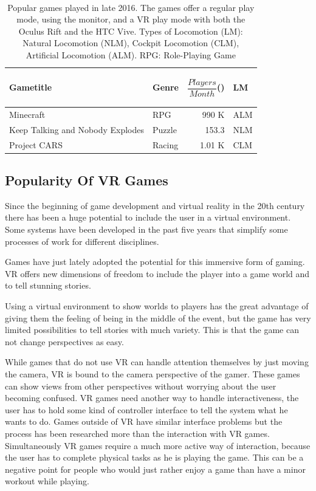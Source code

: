 \begin{table}
	\caption{Popular games played in late 2016. The games offer a regular play mode, using the monitor, and a VR play mode with both the Oculus Rift and the HTC Vive. Types of Locomotion (LM): Natural Locomotion (NLM), Cockpit Locomotion (CLM), Artificial Locomotion (ALM). RPG: Role-Playing Game}~\label{tab:popularGames}
	
	\renewcommand{\arraystretch}{1.3}%
	\begin{tabular*}{\columnwidth}{ p{33mm} l r l }
		Gametitle & Genre & \parbox[c][2.2em][t]{2cm}{\begin{flushright}$\dfrac{Players}{Month}$(\footnotemark[2])\end{flushright}} & LM \\
		\hline
		Minecraft & RPG & 990 K & ALM \\
		Keep Talking and \newline Nobody Explodes & Puzzle & 153.3 & NLM \\
		Project CARS & Racing & 1.01 K & CLM\\
	\end{tabular*}
	
\end{table}


\subsection{Popularity Of VR Games}
Since the beginning of game development and virtual reality in the 20th century there has been a huge potential to include the user in a virtual environment. Some systems have been developed in the past five years that simplify some processes of work for different disciplines. 

Games have just lately adopted the potential for this immersive form of gaming. VR offers new dimensions of freedom to include the player into a game world and to tell stunning stories.

Using a virtual environment to show worlds to players has the great advantage of giving them the feeling of being in the middle of the event, but the game has very limited possibilities to tell stories with much variety. This is that the game can not change perspectives as easy. 

While games that do not use VR can handle attention themselves by just moving the camera, VR is bound to the camera perspective of the gamer. These games can show views from other perspectives without worrying about the user becoming confused. VR games need another way to handle interactiveness, the user has to hold some kind of controller interface to tell the system what he wants to do. Games outside of VR have similar interface problems but the process has been researched more than the interaction with VR games. Simultaneously VR games require a much more active way of interaction, because the user has to complete physical tasks as he is playing the game. This can be a negative point for people who would just rather enjoy a game than have a minor workout while playing.

